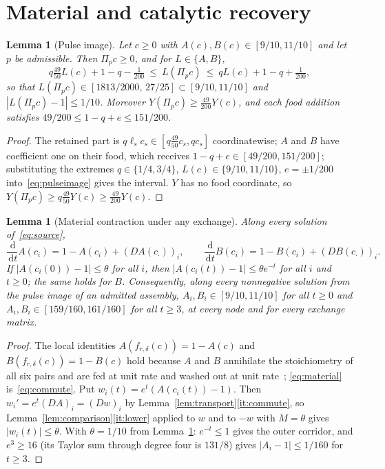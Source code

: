 \documentclass[11pt,a4paper]{article}
\theoremstyle{plain}
\newtheorem{lemma}[theorem]{Lemma}
\theoremstyle{definition}
\theoremstyle{remark}
\newcommand{\dd}{\,\mathrm d}
\newcommand{\Pulse}{\Pi}
\newcommand{\Dop}{D}
\begin{document}
\section{Material and catalytic recovery}\label{sec:recovery}

\begin{lemma}[Pulse image]\label{lem:pulse}
Let $c\ge0$ with $A(c),B(c)\in[9/10,11/10]$ and let $p$ be admissible. Then $\Pulse_pc\ge0$, and for $L\in\{A,B\}$,
\begin{equation}\label{eq:pulseimage}
q\tfrac{49}{50}L(c)+1-q-\tfrac1{200}\ \le\ L(\Pulse_pc)\ \le\ qL(c)+1-q+\tfrac1{200},
\end{equation}
so that $L(\Pulse_pc)\in[1813/2000,\,27/25]\subset[9/10,11/10]$ and $|L(\Pulse_pc)-1|\le1/10$. Moreover $Y(\Pulse_pc)\ge\frac{49}{200}Y(c)$, and each food addition satisfies $49/200\le1-q+e\le151/200$.
\end{lemma}
\begin{proof}
The retained part is $q\ell_sc_s\in[q\frac{49}{50}c_s,qc_s]$ coordinatewise; $A$ and $B$ have coefficient one on their food, which receives $1-q+e\in[49/200,151/200]$; substituting the extremes $q\in\{1/4,3/4\}$, $L(c)\in\{9/10,11/10\}$, $e=\pm1/200$ into~\eqref{eq:pulseimage} gives the interval. $Y$ has no food coordinate, so $Y(\Pulse_pc)\ge q\frac{49}{50}Y(c)\ge\frac{49}{200}Y(c)$.
\end{proof}

\begin{lemma}[Material contraction under any exchange]\label{lem:material}
Along every solution of~\eqref{eq:source},
\begin{equation}\label{eq:material}
\frac{\dd}{\dd t}A(c_i)=1-A(c_i)+(\Dop A(c_\cdot))_i,\qquad \frac{\dd}{\dd t}B(c_i)=1-B(c_i)+(\Dop B(c_\cdot))_i .
\end{equation}
If $|A(c_i(0))-1|\le\theta$ for all $i$, then $|A(c_i(t))-1|\le\theta e^{-t}$ for all $i$ and $t\ge0$; the same holds for $B$. Consequently, along every nonnegative solution from the pulse image of an admitted assembly, $A_i,B_i\in[9/10,11/10]$ for all $t\ge0$ and $A_i,B_i\in[159/160,161/160]$ for all $t\ge3$, at every node and for every exchange matrix.
\end{lemma}
\begin{proof}
The local identities $A(f_{r,\delta}(c))=1-A(c)$ and $B(f_{r,\delta}(c))=1-B(c)$ hold because $A$ and $B$ annihilate the stoichiometry of all six pairs and are fed at unit rate and washed out at unit rate~\citep{recovery2026}; \eqref{eq:material} is~\eqref{eq:commute}. Put $w_i(t)=e^t(A(c_i(t))-1)$. Then $w_i'=e^t(\Dop A)_i=(\Dop w)_i$ by Lemma~\ref{lem:transport}\ref{it:commute}, so Lemma~\ref{lem:comparison}\ref{it:lower} applied to $w$ and to $-w$ with $M=\theta$ gives $|w_i(t)|\le\theta$. With $\theta=1/10$ from Lemma~\ref{lem:pulse}: $e^{-t}\le1$ gives the outer corridor, and $e^3\ge16$ (its Taylor sum through degree four is $131/8$) gives $|A_i-1|\le1/160$ for $t\ge3$.
\end{proof}
\end{document}
